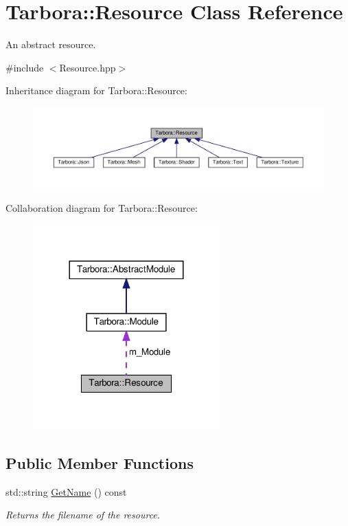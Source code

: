 \hypertarget{classTarbora_1_1Resource}{}\section{Tarbora\+:\+:Resource Class Reference}
\label{classTarbora_1_1Resource}


An abstract resource.  




{\ttfamily \#include $<$Resource.\+hpp$>$}



Inheritance diagram for Tarbora\+:\+:Resource\+:\nopagebreak
\begin{figure}[H]
\begin{center}
\leavevmode
\includegraphics[width=350pt]{classTarbora_1_1Resource__inherit__graph}
\end{center}
\end{figure}


Collaboration diagram for Tarbora\+:\+:Resource\+:
\nopagebreak
\begin{figure}[H]
\begin{center}
\leavevmode
\includegraphics[width=204pt]{classTarbora_1_1Resource__coll__graph}
\end{center}
\end{figure}
\subsection*{Public Member Functions}
\begin{DoxyCompactItemize}
\item 
\mbox{\label{classTarbora_1_1Resource_a4483e47dbcd9f291bce9671983437ee3}} 
std\+::string \hyperlink{classTarbora_1_1Resource_a4483e47dbcd9f291bce9671983437ee3}{Get\+Name} () const
\begin{DoxyCompactList}\small\item\em Returns the filename of the resource. \end{DoxyCompactList}\end{DoxyCompactItemize}
